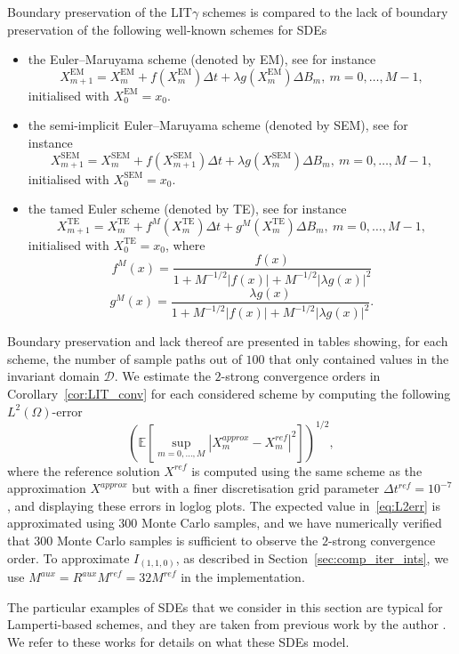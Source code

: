 \documentclass[11pt]{amsart}
\newcommand{\E}{{\mathbb E}}
\newcommand{\D}{\mathcal{D}}
\newcommand{\EM}{\textrm{EM}}
\newcommand{\LIT}{\textrm{LIT}}
\newcommand{\SEM}{\textrm{SEM}}
\newcommand{\TE}{\textrm{TE}}
\begin{document}
{Boundary preservation of the $\LIT \gamma$ schemes is compared to the lack of boundary preservation of the following well-known schemes for SDEs
\begin{itemize}
\item the Euler--Maruyama scheme (denoted by EM), see for instance \cite{MR1214374}
$$
X^{\EM}_{m+1}=X^{\EM}_m+ f(X^{\EM}_{m})\Delta t + \lambda g(X^{\EM}_m) \Delta B_{m},\ m=0,\ldots,M-1,
$$
initialised with $X^{\EM}_{0} = x_{0}$.
\item the semi-implicit Euler--Maruyama scheme (denoted by SEM), see for instance \cite{MR1214374}
$$
X^{\SEM}_{m+1}=X^{\SEM}_m+ f(X^{\SEM}_{m+1})\Delta t + \lambda g(X^{\SEM}_m) \Delta B_{m},\ m=0,\ldots,M-1,
$$
initialised with $X^{\SEM}_{0} = x_{0}$.
\item the tamed Euler scheme (denoted by TE), see for instance \cite{MR2985171}
$$
X^{\TE}_{m+1}=X^{\TE}_m+ f^{M}(X^{\TE}_{m})\Delta t + g^{M}(X^{\TE}_m) \Delta B_{m},\ m=0,\ldots,M-1,
$$
initialised with $X^{\TE}_{0} = x_{0}$, where
$$
f^{M}(x) = \frac{f(x)}{1 + M^{-1/2} |f(x)| + M^{-1/2} | \lambda g(x)|^{2}}
$$
$$
g^{M}(x) = \frac{\lambda g(x)}{1 + M^{-1/2} |f(x)| + M^{-1/2} | \lambda g(x)|^{2}}.
$$
\end{itemize}
Boundary preservation and lack thereof are presented in tables showing, for each scheme, the number of sample paths out of $100$ that only contained values in the invariant domain $\D$. We estimate the $2$-strong convergence orders in Corollary~\ref{cor:LIT_conv} for each considered scheme by computing the following $L^{2}(\Omega)$-error
\begin{equation}\label{eq:L2err}
\left( \E \left[ \sup_{m=0,\ldots,M} \left|X^{approx}_{m} - X^{ref}_{m} \right|^{2} \right] \right)^{1/2},
\end{equation}
where the reference solution $X^{ref}$ is computed using the same scheme as the approximation $X^{approx}$ but with a finer discretisation grid parameter $\Delta t^{ref} = 10^{-7}$, and displaying these errors in loglog plots. The expected value in~\eqref{eq:L2err} is approximated using $300$ Monte Carlo samples, and we have numerically verified that $300$ Monte Carlo samples is sufficient to observe the $2$-strong convergence order. To approximate $I_{(1,1,0)}$, as described in Section~\ref{sec:comp_iter_ints}, we use $M^{aux} = R^{aux} M^{ref} = 32 M^{ref}$ in the implementation.

The particular examples of SDEs that we consider in this section are typical for Lamperti-based schemes, and they are taken from previous work by the author \cite{Ulander2024AB,MR4737060}. We refer to these works for details on what these SDEs model.

}
\end{document}
